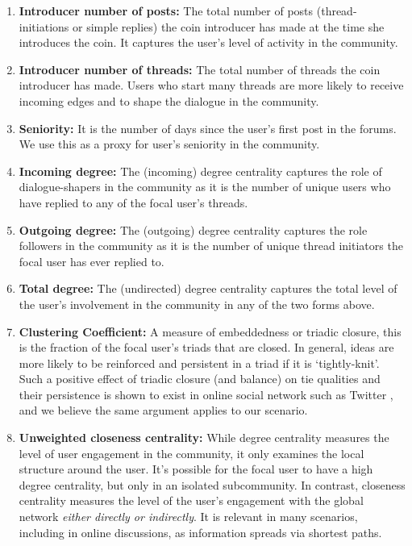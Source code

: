 \begin{enumerate}[topsep=0pt,itemsep=-0.5ex,partopsep=1ex,parsep=1ex]
  \item \textbf{Introducer number of posts:} The total number of posts (thread-initiations or simple replies) the coin introducer has made at the time she introduces the coin. It captures the user's level of activity in the community.
  \item \textbf{Introducer number of threads:} The total number of threads the coin introducer has made. Users who start many threads are more likely to receive incoming edges and to shape the dialogue in the community.
  \item \textbf{Seniority:} It is the number of days since the user's first post in the forums. We use this as a proxy for user's seniority in the community.
  \item \textbf{Incoming degree:} The (incoming) degree centrality captures the role of dialogue-shapers in the community as it is the number of unique users who have replied to any of the focal user's threads.
  \item \textbf{Outgoing degree:} The (outgoing) degree centrality captures the role followers in the community as it is the number of unique thread initiators the focal user has ever replied to. 
  \item \textbf{Total degree:} The (undirected) degree centrality captures the total level of the user's involvement in the community in any of the two forms above.
  \item \textbf{Clustering Coefficient:} A measure of embeddedness or triadic closure, this is the fraction of the focal user's triads that are closed. In general, ideas are more likely to be reinforced and persistent in a triad if it is `tightly-knit'. Such a positive effect of triadic closure (and balance) on tie qualities and their persistence is shown to exist in online social network such as Twitter \cite{KleinbergBalance}, and we believe the same argument applies to our scenario.
  \item \textbf{Unweighted closeness centrality:} While degree centrality measures the level of user engagement in the community, it only examines the local structure around the user. It's possible for the focal user to have a high degree centrality, but only in an isolated subcommunity. In contrast, closeness centrality measures the level of the user's engagement with the global network \textit{either directly or indirectly}. It is relevant in many scenarios, including in online discussions, as information spreads via shortest paths. 
  

\end{enumerate}
